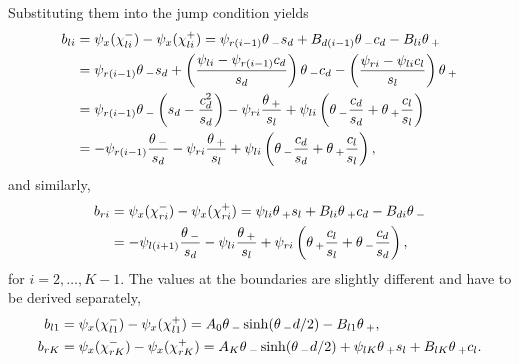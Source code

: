 Substituting them into the jump condition yields
% 
\begin{equation*}
\begin{split}
\begin{aligned}
  b_{li} &= \psi_x(\chi_{li}^-) - \psi_x(\chi_{li}^+) = \psi_{r(i-1)}\theta\,_-s_d + B_{d(i-1)}\theta\,_-c_d -B_{li}\theta\,_+\\
		 &= \psi_{r(i-1)}\theta\,_-s_d + \left(\frac{\psi_{li} - \psi_{r(i-1)}c_d}{s_d}\right)\theta\,_-c_d -\left(\frac{\psi_{ri} - \psi_{li}c_l}{s_l}\right)\theta\,_+\\
		 &= \psi_{r(i-1)}\theta\,_-\left(s_d - \frac{c_d^2}{s_d} \right) - \psi_{ri}\frac{\theta\,_+}{s_l} + \psi_{li}\left(\theta\,_-\frac{c_d}{s_d} + \theta\,_+\frac{c_l}{s_l} \right)\\
		 &= - \psi_{r(i-1)}\frac{\theta\,_-}{s_d} - \psi_{ri}\frac{\theta\,_+}{s_l} + \psi_{li}\left(\theta\,_-\frac{c_d}{s_d} + \theta\,_+\frac{c_l}{s_l} \right),
\end{aligned}
\end{split}
\end{equation*}
% 
and similarly,
% 
\begin{equation*}
\begin{split}
\begin{aligned}
  b_{ri} &= \psi_x(\chi_{ri}^-) - \psi_x(\chi_{ri}^+) = \psi_{li}\theta\,_+s_l + B_{li}\theta\,_+c_d -B_{di}\theta\,_-\\
		 &= - \psi_{l(i+1)}\frac{\theta\,_-}{s_d} - \psi_{li}\frac{\theta\,_+}{s_l} + \psi_{ri}\left(\theta\,_+\frac{c_l}{s_l} + \theta\,_-\frac{c_d}{s_d} \right),
\end{aligned}
\end{split}
\end{equation*}
% 
for $i=2,\ldots,K-1$. The values at the boundaries are slightly different and have to be derived separately,
% 
\begin{equation*}
\begin{split}
\begin{aligned}
  b_{l1} &= \psi_x(\chi_{l1}^-) - \psi_x(\chi_{l1}^+) = A_0\theta\,_-\sinh(\theta\,_-d/2) - B_{l1}\theta\,_+,\\
  b_{rK} &= \psi_x(\chi_{rK}^-) - \psi_x(\chi_{rK}^+) = A_K\theta\,_-\sinh(\theta\,_-d/2) + \psi_{lK}\theta\,_+s_l + B_{lK}\theta\,_+c_l.
\end{aligned}
\end{split}
\end{equation*}

